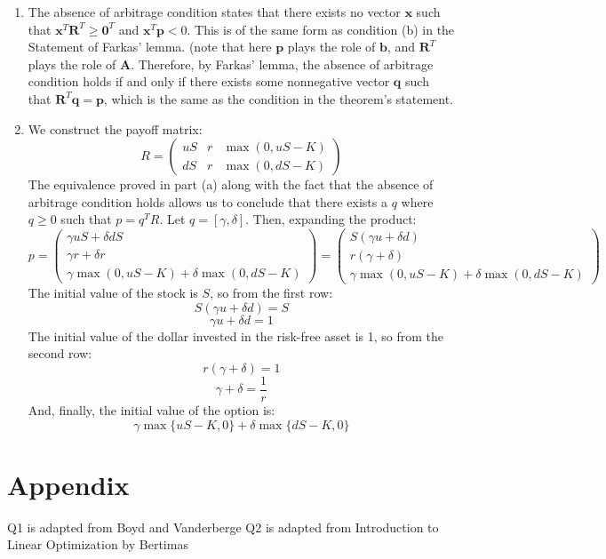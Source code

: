 \documentclass{article}
\begin{document}
\begin{enumerate}[label = \alph*)]
    \item The absence of arbitrage condition states that there exists no vector $\bm{x}$ such that $\bm{x}^{T}\bm{R}^{T} \ge \bm{0}^{T}$ and $\bm{x}^{T}\bm{p} < 0$. This is of the same form as condition (b) in the Statement of Farkas' lemma. (note that here $\bm{p}$ plays the role of $\bm{b}$, and $\bm{R}^{T}$ plays the role of $\bm{A}$. Therefore, by Farkas' lemma, the absence of arbitrage condition holds if and only if there exists some nonnegative vector $\bm{q}$ such that $\bm{R}^{T}\bm{q} = \bm{p}$, which is the same as the condition in the theorem's statement.
    \item We construct the payoff matrix:
    \[ R =
    \begin{pmatrix}
    uS & r & \max(0, uS - K) \\
    dS & r & \max(0, dS - K)
    \end{pmatrix}
    \]
    The equivalence proved in part (a) along with the fact that the absence of arbitrage condition holds allows us to conclude that there exists a \( q \) where \( q \geq 0 \) such that \( p = q^{T} R \). Let \( q = [\gamma, \delta] \). Then, expanding the product:
    \[ p =
    \begin{pmatrix}
    \gamma uS + \delta dS \\
    \gamma r + \delta r \\
    \gamma \max(0, uS - K) + \delta \max(0, dS - K)
    \end{pmatrix}
    =
    \begin{pmatrix}
    S(\gamma u + \delta d) \\
    r(\gamma + \delta) \\
    \gamma \max(0, uS - K) + \delta \max(0, dS - K)
    \end{pmatrix}
    \]
    The initial value of the stock is \( S \), so from the first row:
    \[ S(\gamma u + \delta d) = S \]
    \[ \gamma u + \delta d = 1 \]
    The initial value of the dollar invested in the risk-free asset is 1, so from the second row:
    \[ r(\gamma + \delta) = 1  \]
    \[ \gamma + \delta = \frac{1}{r} \]
    And, finally, the initial value of the option is:
    \[ \gamma \max\{uS - K, 0\} + \delta \max\{dS - K, 0\} \]
\end{enumerate}


\section*{Appendix}
Q1 is adapted from Boyd and Vanderberge
Q2 is adapted from Introduction to Linear Optimization by Bertimas
\end{document}
